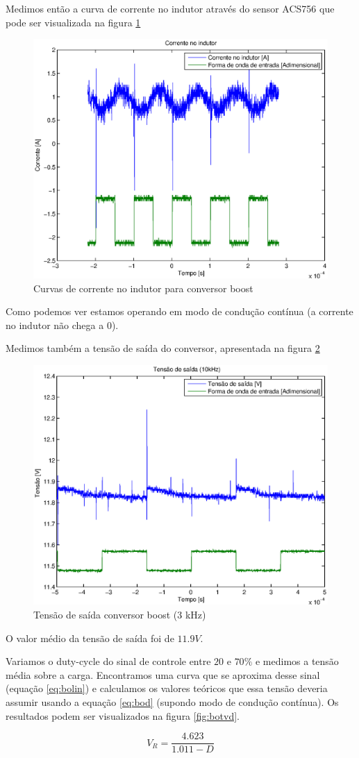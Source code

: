 \documentclass{article}
\begin{document}
Medimos então a curva de corrente no indutor através do sensor ACS756 que pode ser visualizada na figura \ref{fig:boil}
\begin{figure}[H]
	\centering
	\includegraphics[width=0.5\linewidth]{Dados/boost/il}
	\caption{Curvas de corrente no indutor para conversor boost}
	\label{fig:boil}
\end{figure}
Como podemos ver estamos operando em modo de condução contínua (a corrente no indutor não chega a 0).

Medimos também a tensão de saída do conversor, apresentada na figura \ref{fig:bot3k}
\begin{figure}[H]
	\centering
	\includegraphics[width=0.5\linewidth]{Dados/boost/t3k}
	\caption{Tensão de saída conversor boost (3 kHz)}
	\label{fig:bot3k}
\end{figure}

O valor médio da tensão de saída foi de $11.9 V$.

Variamos o duty-cycle do sinal de controle entre $20$ e $70\%$ e medimos a tensão média sobre a carga. Encontramos uma curva que se aproxima desse sinal (equação \ref{eq:bolin}) e calculamos os valores teóricos que essa tensão deveria assumir usando a equação \ref{eq:bod} (supondo modo de condução contínua). Os resultados podem ser visualizados na figura \ref{fig:botvd}.

\begin{capequ}[H]
	\begin{equation}
	V_R = \frac{4.623}{1.011 - D}	
	\end{equation}
	\caption{Curva que aproxima a tensão medida de saída em função do duty-cycle}
	\label{eq:bolin}
\end{capequ}
\end{document}

